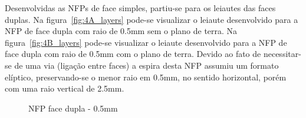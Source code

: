 Desenvolvidas as NFPs de face simples, partiu-se para os leiautes das faces duplas. Na figura~\ref{fig:4A_layers} pode-se visualizar o leiaute desenvolvido para a NFP de face dupla com raio de 0.5mm sem o plano de terra. Na figura~\ref{fig:4B_layers} pode-se visualizar o leiaute desenvolvido para a NFP de face dupla com raio de 0.5mm com o plano de terra. Devido ao fato de necessitar-se de uma via (ligação entre faces) a espira desta NFP assumiu um formato elíptico, preservando-se o menor raio em 0.5mm, no sentido horizontal, porém com uma raio vertical de 2.5mm.
\begin{figure}[htb!]
	\centering
 	\caption{NFP face dupla - 0.5mm}
\end{figure}

